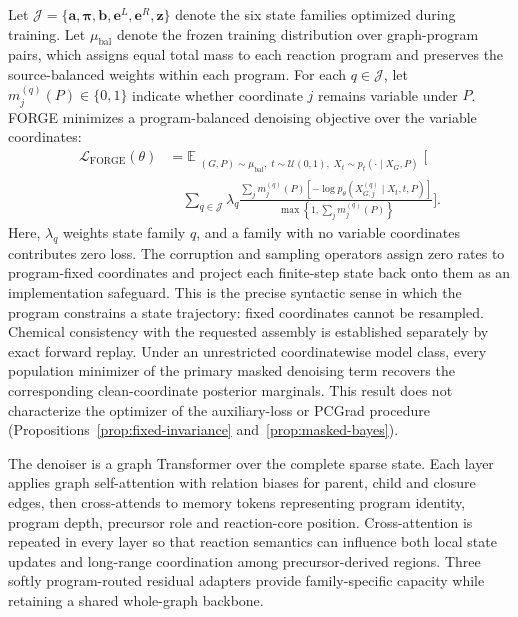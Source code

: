 \documentclass{article}
\begin{document}
Let $\mathscr J=\{\mathbf{a},\boldsymbol{\pi},\mathbf{b},\mathbf{e}^{L},\mathbf{e}^{R},\mathbf{z}\}$
denote the six state families optimized during training.
Let $\mu_{\mathrm{bal}}$ denote the frozen training distribution over graph-program pairs, which
assigns equal total mass to each reaction program and preserves the source-balanced weights within
each program.
For each $q\in\mathscr J$, let $m_j^{(q)}(P)\in\{0,1\}$ indicate whether coordinate $j$ remains
variable under $P$.
FORGE minimizes a program-balanced denoising objective over the variable coordinates:
\begin{equation}
\begin{aligned}
    \mathcal{L}_{\mathrm{FORGE}}(\theta)
    & = \mathbb{E}_{\substack{
        (G,P)\sim\mu_{\mathrm{bal}},\;
        t\sim\mathcal{U}(0,1),\;
        X_t\sim p_t(\cdot\mid X_G,P)
    }}
    \Bigg[
    \\
    & \quad
        \sum_{q\in\mathscr J}
        \lambda_q
        \frac{
            \sum_j m_j^{(q)}(P)
            \left[-\log p_\theta\!\left(X_{G,j}^{(q)}\mid X_t,t,P\right)\right]
        }{
            \max\!\left\{1,\sum_j m_j^{(q)}(P)\right\}
        }
    \Bigg].
\end{aligned}
\end{equation}
Here, $\lambda_q$ weights state family $q$, and a family with no variable coordinates contributes
zero loss.
The corruption and sampling operators assign zero rates to program-fixed coordinates and project
each finite-step state back onto them as an implementation safeguard. This is the precise syntactic
sense in which the program constrains a state trajectory: fixed coordinates cannot be resampled.
Chemical consistency with the requested assembly is established separately by exact forward replay.
Under an unrestricted coordinatewise model class, every population minimizer of the primary masked
denoising term recovers the corresponding clean-coordinate posterior marginals. This result does
not characterize the optimizer of the auxiliary-loss or PCGrad procedure
(Propositions~\ref{prop:fixed-invariance} and~\ref{prop:masked-bayes}).

The denoiser is a graph Transformer over the complete sparse state. Each layer applies graph
self-attention with relation biases for parent, child and closure edges, then cross-attends to memory
tokens representing program identity, program depth, precursor role and reaction-core position.
Cross-attention is repeated in every layer so that reaction semantics can influence both local state
updates and long-range coordination among precursor-derived regions. Three softly program-routed
residual adapters provide family-specific capacity while retaining a shared whole-graph backbone.
\end{document}
